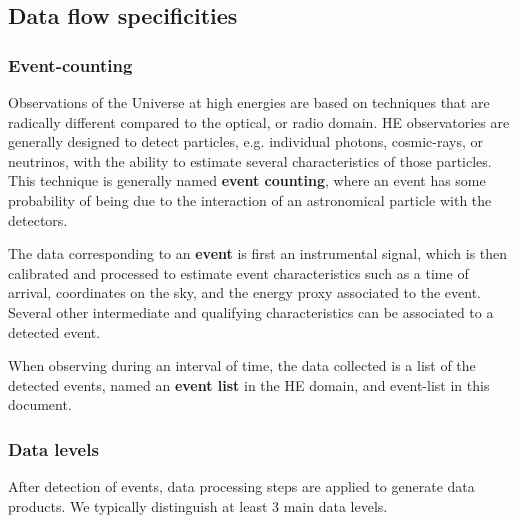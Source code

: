 \documentclass[11pt,a4paper]{ivoa}
\begin{document}
\subsection{Data flow specificities}

\subsubsection{Event-counting}

Observations of the Universe at high energies are based on techniques that are radically different compared to the optical, or radio domain. HE observatories are generally designed to detect particles, e.g. individual photons, cosmic-rays, or neutrinos, with the ability to estimate several characteristics of those particles. This technique is generally named \textbf{event counting}, where an event has some probability of being due to the interaction of an astronomical particle with the detectors.

The data corresponding to an \textbf{event} is first an instrumental signal, which is then calibrated and processed to estimate event characteristics such as a time of arrival, coordinates on the sky, and the energy proxy associated to the event. Several other intermediate and qualifying characteristics can be associated to a detected event.

When observing during an interval of time, the data collected is a list of the detected events, named an \textbf{event list} in the HE domain, and event-list in this document.




\subsubsection{Data levels}\label{sec:datalevels}

After detection of events, data processing steps are applied to generate data products. We typically distinguish at least 3 main data levels. 
\end{document}
